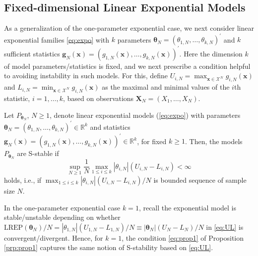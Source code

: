 \documentclass[]{article}
\theoremstyle{definition}
\newcommand{\REP}{\mathrm{LREP}}
\let\BeginKnitrBlock\begin \let\EndKnitrBlock\end
\begin{document}
\subsection{Fixed-dimensional Linear Exponential
Models}\label{fixed-dim-exp}

As a generalization of the one-parameter exponential case, we next
consider linear exponential families \eqref{eq:expo} with \(k\) parameters
\(\boldsymbol \theta_N = (\theta_{1,N},\ldots,\theta_{k,N})^\prime\) and
\(k\) sufficient statistics
\(\boldsymbol g_N(\boldsymbol x) = (g_{1,N}(\boldsymbol x),\ldots, g_{k,N}(\boldsymbol x))^\prime\).
Here the dimension \(k\) of model parameters/statistics is fixed, and we
next prescribe a condition helpful to avoiding instability in such
models. For this, define
\(U_{i,N}=\max_{\boldsymbol x \in\mathcal{X}^N} g_{i,N}(\boldsymbol x)\)
and
\(L_{i,N}=\min_{\boldsymbol x \in\mathcal{X}^N} g_{i,N}(\boldsymbol x)\)
as the maximal and minimal values of the \(i\)th statistic,
\(i=1,\ldots,k\), based on observations
\(\boldsymbol X_N=(X_1,\ldots,X_N)\).

\BeginKnitrBlock{proposition}
\protect\hypertarget{prp:prop1}{}{\label{prp:prop1} }Let
\(P_{\boldsymbol \theta_N}\), \(N \geq 1\), denote linear exponential
models (\ref{eq:expo}) with parameters
\(\boldsymbol \theta_N = (\theta_{1,N},\ldots,\theta_{k,N})^\prime \in \mathbb{R}^k\)
and statistics
\(\boldsymbol g_N(\boldsymbol x) = (g_{1,N}(\boldsymbol x),\ldots, g_{k,N}(\boldsymbol x))^\prime \in \mathbb{R}^k\),
for fixed \(k \geq 1\). Then, the models \(P_{\boldsymbol \theta_N}\)
are S-stable if
\begin{equation}
\label{eq:prop1}
\sup_{N \geq 1}\frac{1}{N} \max_{1 \leq i \leq k }|\theta_{i,N}|(U_{i,N}-L_{i,N})<\infty
\end{equation}
holds, i.e., if
\(\max_{1 \leq i \leq k } |\theta_{i,N}|(U_{i,N}-L_{i,N})/N\) is bounded
sequence of sample size \(N\).
\EndKnitrBlock{proposition}

\BeginKnitrBlock{remark}
\iffalse{} {Remark. } \fi{}In the one-parameter exponential case
\(k=1\), recall the exponential model is stable/unstable depending on
whether
\(\REP(\boldsymbol \theta_N)/N = |\theta_{1,N}|(U_{1,N}-L_{1,N})/N \equiv |\boldsymbol \theta_{N}|(U_{N}-L_{N})/N\)
in \eqref{eq:UL} is convergent/divergent. Hence, for \(k=1\), the
condition \eqref{eq:prop1} of Proposition \ref{prp:prop1} captures the
same notion of S-stability based on \eqref{eq:UL}.
\EndKnitrBlock{remark}
\end{document}
